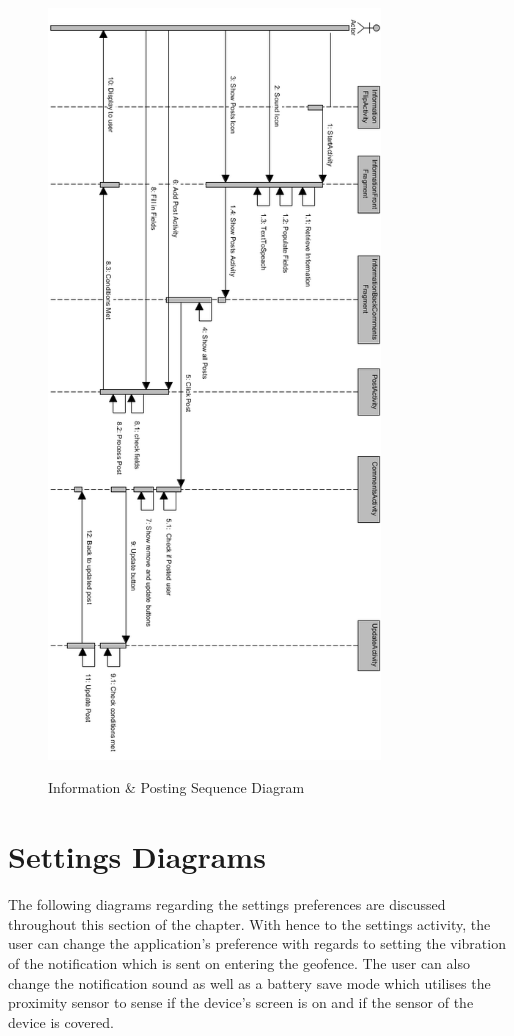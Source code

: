 \begin{figure}[htbp]
    \center \includegraphics[width=250pt]{PostingAndInformationSequence}\\
    \caption{Information \& Posting Sequence Diagram} \label{Figure: Information & Posting Sequence Diagram }
\end{figure}

\newpage

\section{Settings Diagrams}
The following diagrams regarding the settings preferences are discussed throughout this section of the chapter. With hence to the settings activity, the user can change the application's preference with regards to setting the vibration of the notification which is sent on entering the geofence. The user can also change the notification sound as well as a battery save mode which utilises the proximity sensor to sense if the device's screen is on and if the sensor of the device is covered.

